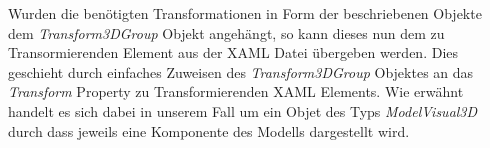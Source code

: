 Wurden die benötigten Transformationen in Form der beschriebenen Objekte dem \textit{ Transform3DGroup} Objekt angehängt, so kann dieses nun dem zu Transormierenden Element aus der XAML Datei übergeben werden. Dies geschieht durch einfaches Zuweisen des \textit{ Transform3DGroup} Objektes an das \textit{ Transform} Property zu Transformierenden XAML Elements. Wie erwähnt handelt es sich dabei in unserem Fall um ein Objet des Typs \textit{ModelVisual3D} durch dass jeweils eine Komponente des Modells dargestellt wird.



